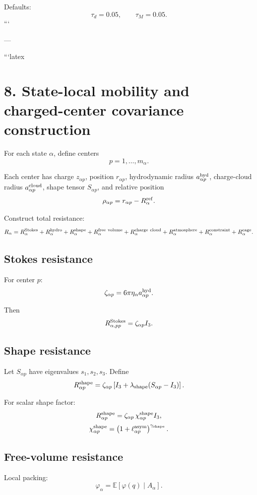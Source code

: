 Defaults:
\[
\tau_d=0.05,
\qquad
\tau_M=0.05.
\]
```

---

```latex
\section{8. State-local mobility and charged-center covariance construction}

For each state \(\alpha\), define centers
\[
p=1,\ldots,m_\alpha.
\]

Each center has charge \(z_{\alpha p}\), position \(r_{\alpha p}\), hydrodynamic
radius \(a_{\alpha p}^{\rm hyd}\), charge-cloud radius \(a_{\alpha p}^{\rm cloud}\),
shape tensor \(S_{\alpha p}\), and relative position
\[
\rho_{\alpha p}=r_{\alpha p}-R_\alpha^{\rm ref}.
\]

Construct total resistance:
\[
R_\alpha
=
R_\alpha^{\rm Stokes}
+
R_\alpha^{\rm hydro}
+
R_\alpha^{\rm shape}
+
R_\alpha^{\rm free\ volume}
+
R_\alpha^{\rm charge\ cloud}
+
R_\alpha^{\rm atmosphere}
+
R_\alpha^{\rm constraint}
+
R_\alpha^{\rm cage}.
\]

\subsection{Stokes resistance}

For center \(p\):
\[
\zeta_{\alpha p}=6\pi\eta_\alpha a_{\alpha p}^{\rm hyd}.
\]

Then
\[
R_{\alpha,pp}^{\rm Stokes}=\zeta_{\alpha p}I_3.
\]

\subsection{Shape resistance}

Let \(S_{\alpha p}\) have eigenvalues \(s_1,s_2,s_3\). Define
\[
R_{\alpha p}^{\rm shape}
=
\zeta_{\alpha p}
\left[
I_3+\lambda_{\rm shape}(S_{\alpha p}-I_3)
\right].
\]

For scalar shape factor:
\[
R_{\alpha p}^{\rm shape}
=
\zeta_{\alpha p}\,
\chi_{\alpha p}^{\rm shape} I_3,
\]
\[
\chi_{\alpha p}^{\rm shape}
=
\left(1+\ell_{\alpha p}^{\rm asym}\right)^{\gamma_{\rm shape}}.
\]

\subsection{Free-volume resistance}

Local packing:
\[
\varphi_\alpha=\mathbb E[\varphi(q)\mid A_\alpha].
\]

